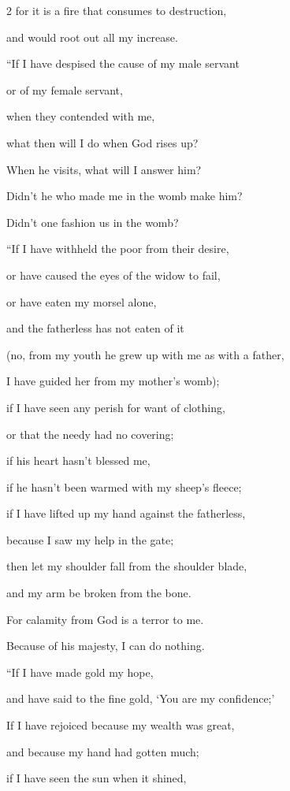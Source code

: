 \begin{multicols}{2}
	\myverse{}for it is a fire that consumes to destruction,
	
	and would root out all my increase.
	
	\myverse{}“If I have despised the cause of my male servant
	
	or of my female servant,
	
	when they contended with me,
	
	\myverse{}what then will I do when God rises up?
	
	When he visits, what will I answer him?
	
	\myverse{}Didn’t he who made me in the womb make him?
	
	Didn’t one fashion us in the womb?
	
	\myverse{}“If I have withheld the poor from their desire,
	
	or have caused the eyes of the widow to fail,
	
	\myverse{}or have eaten my morsel alone,
	
	and the fatherless has not eaten of it
	
	\myverse{}(no, from my youth he grew up with me as with a father,
	
	I have guided her from my mother’s womb);
	
	\myverse{}if I have seen any perish for want of clothing,
	
	or that the needy had no covering;
	
	\myverse{}if his heart hasn’t blessed me,
	
	if he hasn’t been warmed with my sheep’s fleece;
	
	\myverse{}if I have lifted up my hand against the fatherless,
	
	because I saw my help in the gate;
	
	\myverse{}then let my shoulder fall from the shoulder blade,
	
	and my arm be broken from the bone.
	
	\myverse{}For calamity from God is a terror to me.
	
	Because of his majesty, I can do nothing.
	
	\myverse{}“If I have made gold my hope,
	
	and have said to the fine gold, ‘You are my confidence;’
	
	\myverse{}If I have rejoiced because my wealth was great,
	
	and because my hand had gotten much;
	
	\myverse{}if I have seen the sun when it shined,
	

\end{multicols}
